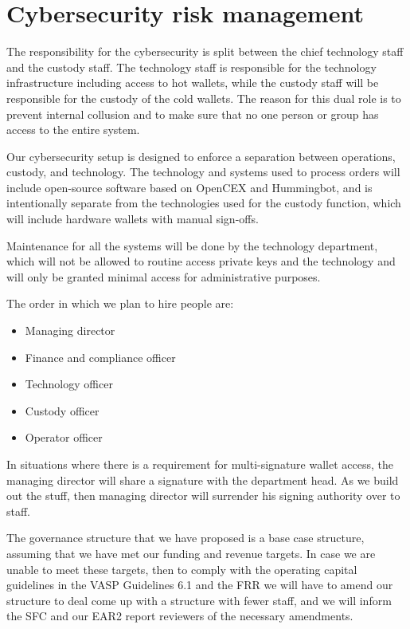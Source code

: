 \section{Cybersecurity risk management}

The responsibility for the cybersecurity is split between the chief
technology staff and the custody staff.  The technology staff is
responsible for the technology infrastructure including access to hot
wallets, while the custody staff will be responsible for the custody
of the cold wallets.  The reason for this dual role is to prevent
internal collusion and to make sure that no one person or group has
access to the entire system.

Our cybersecurity setup is designed to enforce a separation between
operations, custody, and technology.  The technology and systems used
to process orders will include open-source software based on OpenCEX
and Hummingbot, and is intentionally separate from the technologies
used for the custody function, which will include hardware wallets with
manual sign-offs.

Maintenance for all the systems will be done by the technology
department, which will not be allowed to routine access private keys
and the technology and will only be granted minimal access for
administrative purposes.

The order in which we plan to hire people are:

\begin{itemize}
\item Managing director
\item Finance and compliance officer
\item Technology officer 
\item Custody officer
\item Operator officer
\end{itemize}

In situations where there is a requirement for multi-signature wallet
access, the managing director will share a signature with the
department head.  As we build out the stuff, then managing director
will surrender his signing authority over to staff.

The governance structure that we have proposed is a base case
structure, assuming that we have met our funding and revenue targets.
In case we are unable to meet these targets, then to comply with the
operating capital guidelines in the VASP Guidelines 6.1 and the FRR we
will have to amend our structure to deal come up with a structure with
fewer staff, and we will inform the SFC and our EAR2 report reviewers
of the necessary amendments.

